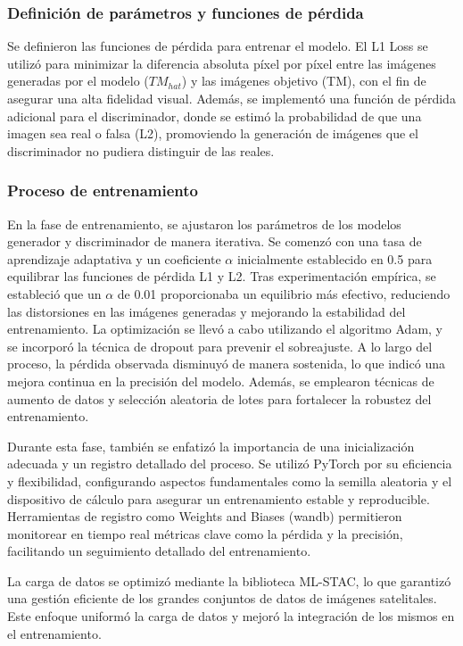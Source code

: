             \subsubsection{Definición de parámetros y funciones de pérdida}
                Se definieron las funciones de pérdida para entrenar el modelo. El L1 Loss se utilizó para minimizar la diferencia absoluta píxel por píxel entre las imágenes generadas por el modelo (\(TM_{hat}\)) y las imágenes objetivo (TM), con el fin de asegurar una alta fidelidad visual. Además, se implementó una función de pérdida adicional para el discriminador, donde se estimó la probabilidad de que una imagen sea real o falsa (L2), promoviendo la generación de imágenes que el discriminador no pudiera distinguir de las reales.

            \subsubsection{Proceso de entrenamiento}
                En la fase de entrenamiento, se ajustaron los parámetros de los modelos generador y discriminador de manera iterativa. Se comenzó con una tasa de aprendizaje adaptativa y un coeficiente \( \alpha \) inicialmente establecido en 0.5 para equilibrar las funciones de pérdida L1 y L2. Tras experimentación empírica, se estableció que un \( \alpha \) de 0.01 proporcionaba un equilibrio más efectivo, reduciendo las distorsiones en las imágenes generadas y mejorando la estabilidad del entrenamiento. La optimización se llevó a cabo utilizando el algoritmo Adam, y se incorporó la técnica de dropout para prevenir el sobreajuste. A lo largo del proceso, la pérdida observada disminuyó de manera sostenida, lo que indicó una mejora continua en la precisión del modelo. Además, se emplearon técnicas de aumento de datos y selección aleatoria de lotes para fortalecer la robustez del entrenamiento.

                Durante esta fase, también se enfatizó la importancia de una inicialización adecuada y un registro detallado del proceso. Se utilizó PyTorch por su eficiencia y flexibilidad, configurando aspectos fundamentales como la semilla aleatoria y el dispositivo de cálculo para asegurar un entrenamiento estable y reproducible. Herramientas de registro como Weights and Biases (wandb) permitieron monitorear en tiempo real métricas clave como la pérdida y la precisión, facilitando un seguimiento detallado del entrenamiento.

                La carga de datos se optimizó mediante la biblioteca ML-STAC, lo que garantizó una gestión eficiente de los grandes conjuntos de datos de imágenes satelitales. Este enfoque uniformó la carga de datos y mejoró la integración de los mismos en el entrenamiento.


